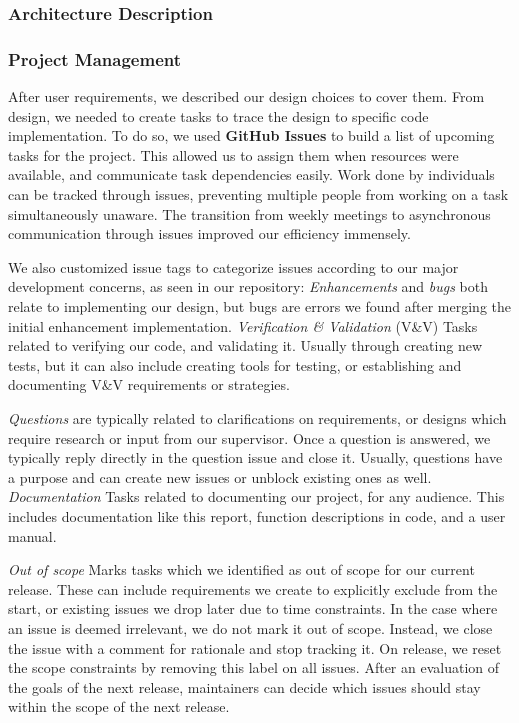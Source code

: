 \documentclass[11pt]{article}
\begin{document}
    \newpage
    \subsubsection{Architecture Description}\label{subsubsec:arch-desc}

    \newpage
    \subsubsection{Project Management}\label{subsubsec:proj-mngmnt}
    After user requirements, we described our design choices to cover them.
    From design, we needed to create tasks to trace the design to specific code implementation.
    To do so, we used \textbf{GitHub Issues} to build a list of upcoming tasks for the project.
    This allowed us to assign them when resources were available, and communicate task dependencies easily.
    Work done by individuals can be tracked through issues,
    preventing multiple people from working on a task simultaneously unaware.
    The transition from weekly meetings to asynchronous communication through issues improved our efficiency immensely.

    We also customized issue tags to categorize issues
    according to our major development concerns, as seen in our repository:
    \textit{Enhancements} and \textit{bugs} both relate to implementing our design,
    but bugs are errors we found after merging the initial enhancement implementation.
    \textit{Verification \& Validation} (V\&V) Tasks related to verifying our code, and validating it.
    Usually through creating new tests, but it can also include creating tools for testing,
    or establishing and documenting V\&V requirements or strategies.

    \textit{Questions} are typically related to clarifications on requirements,
    or designs which require research or input from our supervisor.
    Once a question is answered, we typically reply directly in the question issue and close it.
    Usually, questions have a purpose and can create new issues or unblock existing ones as well.
    \textit{Documentation} Tasks related to documenting our project, for any audience.
    This includes documentation like this report, function descriptions in code, and a user manual.

    \textit{Out of scope} Marks tasks which we identified as out of scope for our current release.
    These can include requirements we create to explicitly exclude from the start,
    or existing issues we drop later due to time constraints.
    In the case where an issue is deemed irrelevant, we do not mark it out of scope.
    Instead, we close the issue with a comment for rationale and stop tracking it.
    On release, we reset the scope constraints by removing this label on all issues.
    After an evaluation of the goals of the next release,
    maintainers can decide which issues should stay within the scope of the next release.
\end{document}
